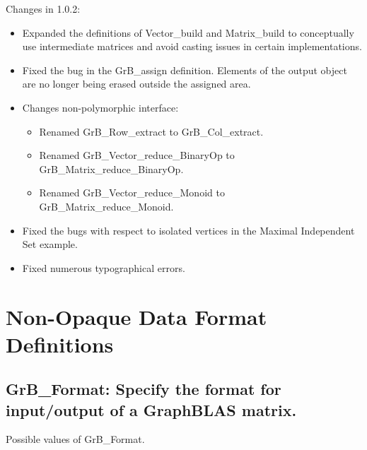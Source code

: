 Changes in 1.0.2:
\begin{itemize}
\item Expanded the definitions of {\sf Vector\_build} and {\sf Matrix\_build} to conceptually use intermediate matrices and avoid casting issues in certain implementations.
\item Fixed the bug in the {\sf GrB\_assign} definition. Elements of the output object are no longer being erased outside the assigned area.
\item Changes non-polymorphic interface:
    \begin{itemize}
    \item Renamed {\sf GrB\_Row\_extract} to {\sf GrB\_Col\_extract}.
    \item Renamed {\sf GrB\_Vector\_reduce\_BinaryOp} to {\sf GrB\_Matrix\_reduce\_BinaryOp}.
    \item Renamed {\sf GrB\_Vector\_reduce\_Monoid} to {\sf GrB\_Matrix\_reduce\_Monoid}.
    \end{itemize}
\item Fixed the bugs with respect to isolated vertices in the Maximal Independent Set example.
\item Fixed numerous typographical errors.
\end{itemize}

\chapter{Non-Opaque Data Format Definitions}
\label{Chp:GrB_Format}

\section{{\sf GrB\_Format}: Specify the format for input/output of a GraphBLAS matrix.}
\label{Sec:GrB_Format}

Possible values of {\sf GrB\_Format}.

